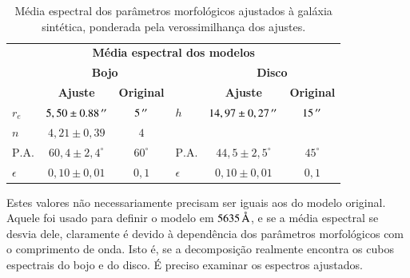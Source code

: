 \begin{table}
\begin{tabular}{ l c c l c c }
  \hline
  \multicolumn{6}{c}{\textbf{Média espectral dos modelos}} \\
  & \multicolumn{2}{c}{\textbf{Bojo}} & & \multicolumn{2}{c}{\textbf{Disco}} \\
  & \textbf{Ajuste} & \textbf{Original} & & \textbf{Ajuste} & \textbf{Original} \\
  \hline
  $r_e$ & $5,50 \pm 0.88\,^{\prime\prime}$ & $5\,^{\prime\prime}$ & $h$ & $14,97 \pm
  0,27\,^{\prime\prime}$ & $15\,^{\prime\prime}$ \\
  $n$ & $4,21 \pm 0,39$ & $4$ & & & \\
  $\mathrm{P.A.}$ & $60,4 \pm 2,4^\circ$ & $60^\circ$ & $\mathrm{P.A.}$ &
  $44,5 \pm 2,5^\circ$ & $45^\circ$ \\
  $\epsilon$ & $0,10 \pm 0,01$ & $0,1$ & $\epsilon$ & $0,10 \pm 0,01$ &
  $0,1$ \\
  \hline
\end{tabular}
\caption[Ajuste morfológico espectral -- média dos parâmetros]
{Média espectral dos parâmetros morfológicos ajustados à galáxia sintética,
ponderada pela verossimilhança dos ajustes.}
\label{tab:testeModeloAjuste}
\end{table}

Estes valores não necessariamente precisam ser iguais aos do modelo original.
Aquele foi usado para definir o modelo em $5635\,\text{\normalfont\AA}$, e se a média
espectral se desvia dele, claramente é devido à dependência dos parâmetros
morfológicos com o comprimento de onda. Isto é, se a decomposição realmente
encontra os cubos espectrais do bojo e do disco. É preciso examinar os espectros
ajustados.

